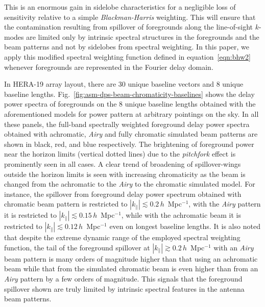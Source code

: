 \documentclass[preprint2,iop,numberedappendix,twocolappendix,appendixfloats]{emulateapj}
\begin{document}
This is an enormous gain in sidelobe characteristics for a negligible loss of sensitivity relative to a simple {\it Blackman-Harris} weighting. This will ensure that the contamination resulting from spillover of foregrounds along the line-of-sight $k$-modes are limited only by intrinsic spectral structures in the foregrounds and the beam patterns and not by sidelobes from spectral weighting. In this paper, we apply this modified spectral weighting function defined in equation~\ref{eqn:bhw2} whenever foregrounds are represented in the Fourier delay domain. 

In HERA-19 array layout, there are 30 unique baseline vectors and 8 unique baseline lengths. Fig.~\ref{fig:asm-dps-beam-chromaticity-baselines} shows the delay power spectra of foregrounds on the 8 unique baseline lengths obtained with the aforementioned models for power pattern at arbitrary pointings on the sky. In all these panels, the full-band spectrally weighted foreground delay power spectra obtained with achromatic, {\it Airy} and fully chromatic simulated beam patterns are shown in black, red, and blue respectively. The brightening of foreground power near the horizon limits (vertical dotted lines) due to the {\it pitchfork} effect \citep{thy15a,thy15b} is prominently seen in all cases. A clear trend of broadening of spillover-wings outside the horizon limits is seen with increasing chromaticity as the beam is changed from the achromatic to the {\it Airy} to the chromatic simulated model. For instance, the spillover from foreground delay power spectrum obtained with chromatic beam pattern is restricted to $|k_\parallel| \lesssim 0.2\,h$~Mpc$^{-1}$, with the {\it Airy} pattern it is restricted to $|k_\parallel| \lesssim 0.15\,h$~Mpc$^{-1}$, while with the achromatic beam it is restricted to $|k_\parallel| \lesssim 0.12\,h$~Mpc$^{-1}$ even on longest baseline lengths. It is also noted that despite the extreme dynamic range of the employed spectral weighting function, the tail of the foreground spillover at $|k_\parallel| \gtrsim 0.2\,h$~Mpc$^{-1}$ with an {\it Airy} beam pattern is many orders of magnitude higher than that using an achromatic beam while that from the simulated chromatic beam is even higher than from an {\it Airy} pattern by a few orders of magnitude. This signals that the foreground spillover shown are truly limited by intrinsic spectral features in the antenna beam patterns. 
\end{document}
